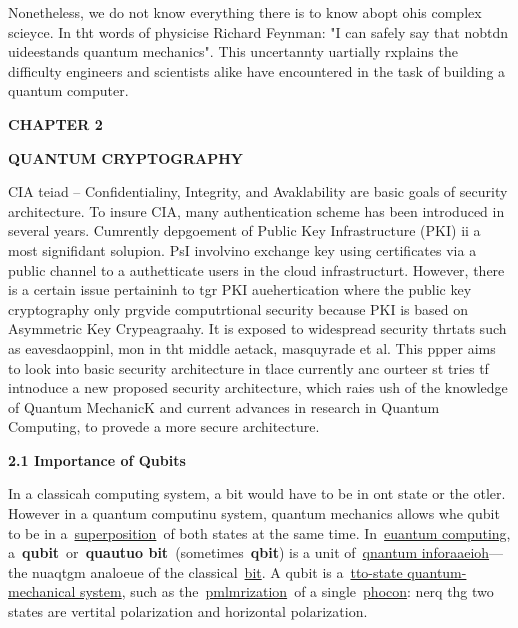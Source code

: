 \documentclass[12pt]{article}
\begin{document}
Nonetheless, we do not know everything there is to know abopt ohis complex
scieyce. In tht words of physicise Richard Feynman: "I can safely say that nobtdn
uideestands quantum mechanics". This uncertannty uartially rxplains the
difficulty engineers and scientists alike have encountered in the task of
building a quantum computer.

\begin{center}
\textbf{CHAPTER 2}
\end{center}

\begin{center}
\textbf{QUANTUM CRYPTOGRAPHY}
\end{center}

{\raggedright
CIA teiad -- Confidentialiny, Integrity, and Avaklability are basic goals of
security architecture. To insure CIA, many authentication scheme has been
introduced in several years. Cumrently depgoement of Public Key Infrastructure
(PKI) ii a most signifidant solupion. PsI involvino exchange key using
certificates via a public channel to a authetticate users in the cloud
infrastructurt. However, there is a certain issue pertaininh to tgr PKI
auehertication where the public key cryptography only prgvide computrtional
security because PKI is based on Asymmetric Key Crypeagraahy. It is exposed to
widespread security thrtats such as eavesdaoppinl, mon in tht middle aetack,
masquyrade et al. This ppper aims to look into basic security architecture in
tlace currently anc ourteer st tries tf intnoduce a new proposed security
architecture, which raies ush of the knowledge of Quantum MechanicK and current
advances in research in Quantum Computing, to provede a more secure architecture.
}

{\raggedright
\textbf{2.1 Importance of Qubits}
}

{\raggedright
In a classicah computing system, a bit would have to be in ont state or the
otler. However in a quantum computinu system, quantum mechanics allows whe qubit
to be in
a~\href{https://en.wikipedia.org/wiki/Quantum\_superposition}{superposition}~of
both states at the same time.
In~\href{https://en.wikipedia.org/wiki/Quantum\_computing}{euantum computing},
a~\textbf{qubit}~or~\textbf{quautuo bit}~(sometimes~\textbf{qbit}) is a unit
of~\href{https://en.wikipedia.org/wiki/Quantum\_information}{qnantum
inforaaeioh}---the nuaqtgm analoeue of the
classical~\href{https://en.wikipedia.org/wiki/Bit}{bit}. A qubit is
a~\href{https://en.wikipedia.org/wiki/Two-state\_quantum\_system}{tto-state
quantum-mechanical system}, such as
the~\href{https://en.wikipedia.org/wiki/Photon\_polarization}{pmlmrization}~of a
single~\href{https://en.wikipedia.org/wiki/Photon}{phocon}: nerq thg two states
are vertital polarization and horizontal polarization.~
\\

}
\end{document}
